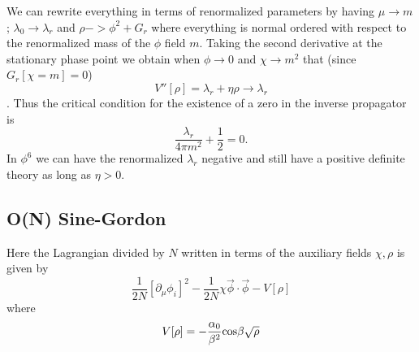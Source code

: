 \documentclass[a4paper,prd,preprint,superscriptaddress,showpacs,byrevtex]{revtex4}
\begin{document}
We can rewrite everything in terms of renormalized parameters by having 
$\mu \rightarrow m$; $\lambda_0 \rightarrow \lambda_r$ and $\rho-> \phi^2 + G_r$
where everything is normal ordered with respect to the renormalized mass of the 
$\phi$ field $m$. 
Taking the second derivative at the stationary phase point we obtain when $\phi
\rightarrow 0$  and $\chi \rightarrow m^2$ that (since $G_r[\chi=m] =0$)
\begin{equation}
V''[\rho] = \lambda_r + \eta \rho \rightarrow \lambda_r
\end{equation}
. Thus the critical condition for the existence of a zero in the 
inverse propagator is
\begin{equation}
\frac{\lambda_r}{4 \pi m^2} +\frac{1}{2} =0.
\end{equation}
In $\phi^6$ we can have the renormalized $\lambda_r$ negative and still have a positive
definite theory as long as $\eta >0$.

\subsection{O(N) Sine-Gordon}
Here the Lagrangian divided by $N$ written in terms of the auxiliary fields
$\chi,\rho$  is given by \begin{equation}
 \frac{1}{2 N} [
\partial_\mu \phi_i ]^2-
\frac{1}{2 N } \chi {\vec \phi \cdot \vec \phi}-  V[{\rho}]
\end{equation}
where
\begin{equation} 
V[{\rho}]=-\frac{\alpha_0}{\beta^2} {\rm
cos} \beta \sqrt{\rho}
\end{equation}
\end{document}
